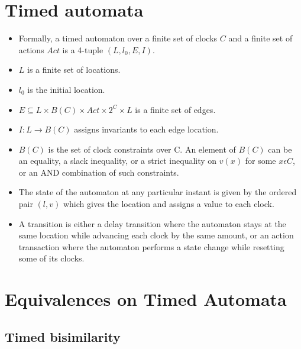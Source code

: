 \documentclass{article}
\begin{document}
\section{Timed automata}

  \begin{itemize}
  \item Formally, a timed automaton over a finite set of clocks $C$
    and a finite set of actions $Act$ is a 4-tuple $(L, l_{0}, E, I)$.
  \item $L$ is a finite set of locations.
  \item $l_{0}$ is the initial location.
  \item $E \subseteq L \times B(C) \times Act \times 2^{C} \times L$
    is a finite set of edges.
  \item $I: L \rightarrow B(C)$ assigns invariants to each edge
    location.
  \item $B(C)$ is the set of clock constraints over C. An element of $B(C)$
    can be an equality, a slack inequality, or a strict inequality on
    $v(x)$ for some $x \epsilon C$, or
    an AND combination of such constraints.
  \item The state of the automaton at any particular instant is given
    by the ordered pair $(l, v)$ which gives the location and assigns
    a value to each clock. 
  \item A transition is either a delay transition where the automaton
    stays at the same location while advancing each clock by the same
    amount, or an action transaction where the automaton performs a
    state change while resetting some of its clocks.
  \end{itemize}

\section{Equivalences on Timed Automata}

\subsection{Timed bisimilarity}
\end{document}
